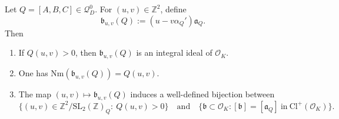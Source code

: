 \documentclass[10pt,a4paper]{amsart}
\begin{document}
\begin{lemma}\label{lem-pairtoideal}
Let $Q=[A,B,C]\in\mathcal{Q}_{D}^{0}$.
For $(u,v)\in\mathbb{Z}^{2}$, define
$$\mathfrak{b}_{u,v}(Q):=(u-v\alpha_{Q}')\mathfrak{a}_{Q}.$$
Then
\begin{enumerate}
    \item[\textnormal{(i)}] If $Q(u,v)>0$, then $\mathfrak{b}_{u,v}(Q)$ is an integral ideal of $\mathcal{O}_{K}$.
    \item[\textnormal{(ii)}] One has $\mathrm{Nm}(\mathfrak{b}_{u,v}(Q))=Q(u,v)$.
    \item[\textnormal{(iii)}] The map $(u,v)\mapsto\mathfrak{b}_{u,v}(Q)$ induces a well-defined bijection between
    \begin{equation}\label{eq-pairideal}
        \{(u,v)\in\mathbb{Z}^2/\mathrm{SL}_{2}(\mathbb{Z})_{Q}:\ Q(u,v)>0\}\quad\text{and}\quad
        \{\mathfrak{b}\subset\mathcal{O}_{K}:[\mathfrak{b}]=[\mathfrak{a}_{Q}]~\text{in}~\mathrm{Cl}^{+}(\mathcal{O}_{K})\}.
    \end{equation}
\end{enumerate}
\end{lemma}
\end{document}
